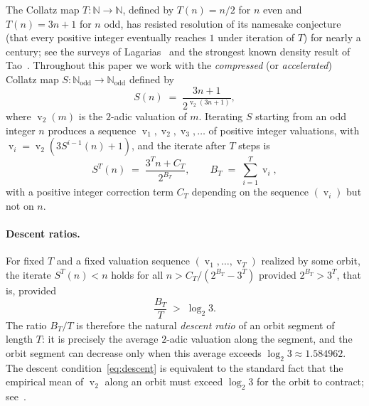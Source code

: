 \documentclass[11pt,a4paper]{article}
\theoremstyle{definition}
\theoremstyle{remark}
\DeclareMathOperator{\val}{v}
\newcommand{\N}{\mathbb{N}}
\newcommand{\Nodd}{\N_{\mathrm{odd}}}
\begin{document}
The Collatz map $T \colon \N \to \N$, defined by $T(n) = n/2$ for $n$
even and $T(n) = 3n + 1$ for $n$ odd, has resisted resolution of its
namesake conjecture (that every positive integer eventually reaches
$1$ under iteration of $T$) for nearly a century; see the surveys of
Lagarias~\cite{Lagarias1985,Lagarias2010} and the strongest known
density result of Tao~\cite{Tao2022}.  Throughout this paper we work
with the \emph{compressed} (or \emph{accelerated}) Collatz map
$S \colon \Nodd \to \Nodd$ defined by
\begin{equation}\label{eq:S-def}
  S(n) \;=\; \frac{3n + 1}{2^{\val_2(3n + 1)}},
\end{equation}
where $\val_2(m)$ is the $2$-adic valuation of $m$.  Iterating $S$
starting from an odd integer $n$ produces a sequence
$\val_1, \val_2, \val_3, \ldots$ of positive integer valuations, with
$\val_i = \val_2(3 S^{i-1}(n) + 1)$, and the iterate after $T$ steps is
\begin{equation}\label{eq:ST}
  S^T(n) \;=\; \frac{3^T n + C_T}{2^{B_T}},
  \qquad
  B_T \;=\; \sum_{i=1}^{T} \val_i,
\end{equation}
with a positive integer correction term $C_T$ depending on the
sequence $(\val_i)$ but not on $n$.

\paragraph{Descent ratios.}
For fixed $T$ and a fixed valuation sequence $(\val_1, \ldots, \val_T)$
realized by some orbit, the iterate $S^T(n) < n$ holds for all
$n > C_T / (2^{B_T} - 3^T)$ provided $2^{B_T} > 3^T$, that is,
provided
\begin{equation}\label{eq:descent}
  \frac{B_T}{T} \;>\; \log_2 3.
\end{equation}
The ratio $B_T / T$ is therefore the natural \emph{descent ratio} of
an orbit segment of length $T$: it is precisely the average $2$-adic
valuation along the segment, and the orbit segment can decrease only
when this average exceeds $\log_2 3 \approx 1.584962$.  The descent
condition~\eqref{eq:descent} is equivalent to the standard fact that
the empirical mean of $\val_2$ along an orbit must exceed $\log_2 3$
for the orbit to contract; see~\cite[\S 2]{Lagarias1985}.
\end{document}
